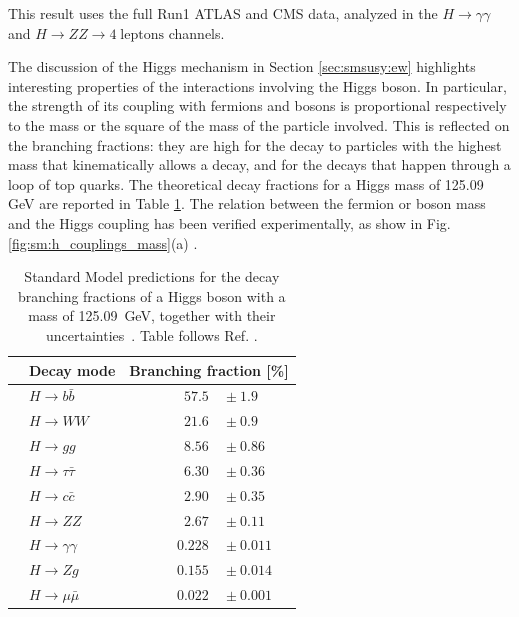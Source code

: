 This result uses the full Run1 ATLAS and CMS data, analyzed in the $H \rightarrow \gamma \gamma$ and $H \rightarrow ZZ \rightarrow 4 \; \mathrm{leptons}$ channels.


The discussion of the Higgs mechanism in Section \ref{sec:smsusy:ew} highlights interesting properties of the interactions involving the Higgs boson. In particular, the strength of its coupling with fermions and bosons is proportional respectively to the mass or the square of the mass of the particle involved. This is reflected on the branching fractions: they are high for the decay to particles with the highest mass that kinematically allows a decay, and for the decays that happen through a loop of top quarks. The theoretical decay fractions for a Higgs mass of 125.09 GeV are reported in Table \ref{tab:SMBranchingFractions}. The relation between the fermion or boson mass and the Higgs coupling has been verified experimentally, as show in Fig. \ref{fig:sm:h_couplings_mass}(a) \cite{Khachatryan:2016vau}. 

\begin{table}[htbp]
\begin{center}
\begin{tabular}{clcr@{\hskip 0.4ex}l} \\ 
\hline
 &    Decay mode &\multicolumn{3}{c}{Branching fraction [\%]}  \\  \hline
 \hline
 &     $H \rightarrow b\bar{b}$       & &   $57.5$&${}\pm 1.9$    \\
 &     $H \rightarrow WW$       & &   $21.6$&${}\pm 0.9$   \\
 &     $H \rightarrow gg$       & &   $8.56$&${}\pm 0.86$  \\
 &     $H \rightarrow \tau \bar{\tau}$       & &   $6.30$&${}\pm 0.36$  \\
 &     $H \rightarrow c\bar{c}$       & &   $2.90$&${}\pm 0.35$  \\
 &     $H \rightarrow ZZ$       & &   $2.67$&${}\pm 0.11$  \\
 &     $H \rightarrow \gamma \gamma$       & &   $0.228$&${}\pm 0.011$  \\
 &     $H \rightarrow Zg$       & &   $0.155$&${}\pm 0.014$  \\
 &     $H \rightarrow \mu \bar{\mu}$       & &   ~~$0.022$&${}\pm 0.001$  \\ 
\hline
\end{tabular} 
\end{center}
\caption{Standard Model predictions for the decay branching fractions of a Higgs boson with a mass of 125.09~GeV, together with their uncertainties~\cite{Heinemeyer:2013tqa}. Table follows Ref. \cite{Khachatryan:2016vau}.}
\label{tab:SMBranchingFractions}
\end{table} 

